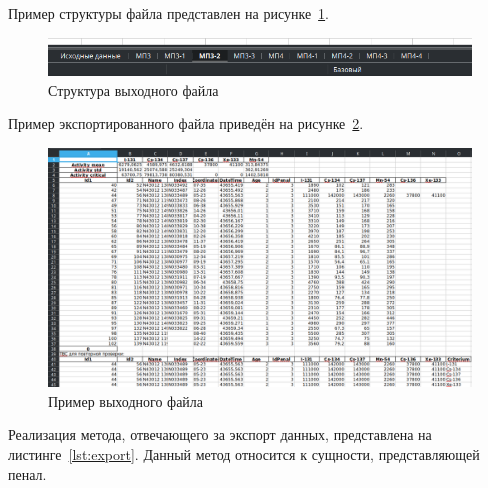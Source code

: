 Пример структуры файла представлен на рисунке~\ref{fig:ris15}.

\begin{figure}[H]
	\centering
	\includegraphics[width=1\linewidth]{pics/ris15} %
	\caption{Структура выходного файла}
	\label{fig:ris15} %
\end{figure}

Пример экспортированного файла приведён на рисунке~\ref{fig:ris12}.

\begin{figure}[H]
	\centering
	\includegraphics[width=1\linewidth]{pics/ris12} %
	\caption{Пример выходного файла}
	\label{fig:ris12} %
\end{figure}

Реализация метода, отвечающего за экспорт данных, представлена на листинге~\ref{lst:export}. Данный метод относится к сущности, представляющей пенал.


